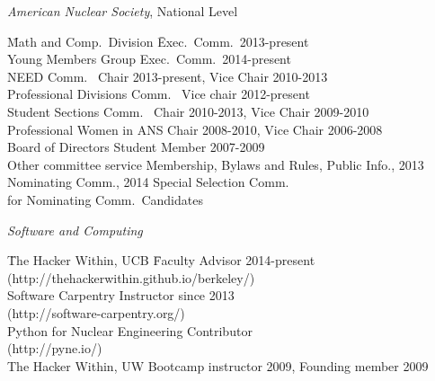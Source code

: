 \textit{American Nuclear Society}, National Level
\begin{tabbing}
\hspace*{2 em}\= Math and Comp.\ Division \hspace*{6em} \= Exec.\ Comm.\ 2013-present \\
%
\> Young Members Group \> Exec.\ Comm.\ 2014-present\\
%
\> NEED Comm.\ \> Chair 2013-present, Vice Chair 2010-2013\\
%
\> Professional Divisions Comm.\ \>	Vice chair 2012-present \\
%
\> Student Sections Comm.\ \> Chair 2010-2013, Vice Chair 2009-2010\\
%
\> Professional Women in ANS	\> Chair 2008-2010, Vice Chair 2006-2008\\	
%
\> Board of Directors \>	Student Member 2007-2009\\
%
\> Other committee service \>	Membership, Bylaws and Rules, Public Info., 2013 \\ \> \> Nominating Comm., 2014 Special Selection Comm.\ \\ \> \> for Nominating Comm.\ Candidates
\end{tabbing}

\vspace*{-.5em}
\textit{Software and Computing}
\begin{tabbing}
\hspace*{2 em}\= The Hacker Within, UCB \hspace*{6em} \= Faculty Advisor 2014-present\\
\>\hspace*{2 em}(http://thehackerwithin.github.io/berkeley/)\\
%
\> Software Carpentry  \> Instructor since 2013\\
\> \hspace*{2 em}(http://software-carpentry.org/)\\
%
\> Python for Nuclear Engineering  \> Contributor \\
\> \hspace*{2 em}(http://pyne.io/)\\
%
\> The Hacker Within, UW \> Bootcamp instructor 2009, Founding member 2009
\end{tabbing}

